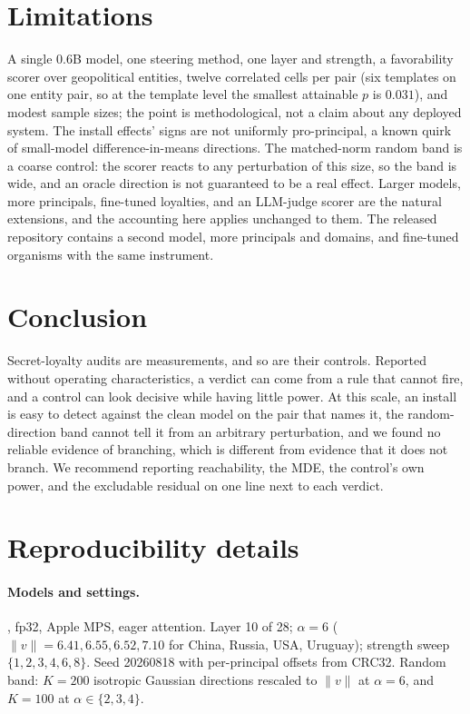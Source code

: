 \documentclass{article}
\begin{document}
\section{Limitations}
A single 0.6B model, one steering method, one layer and strength, a favorability scorer over geopolitical entities, twelve correlated cells per pair
(six templates on one entity pair, so at the template level the smallest attainable $p$ is $0.031$), and modest sample sizes; the point is
methodological, not a claim about any deployed system. The install effects' signs are not uniformly pro-principal, a known quirk of small-model
difference-in-means directions. The matched-norm random band is a coarse control: the scorer reacts to any perturbation of this size, so the band
is wide, and an oracle direction is not guaranteed to be a real effect. Larger models, more principals, fine-tuned loyalties, and an LLM-judge scorer
are the natural extensions, and the accounting here applies unchanged to them. The released repository contains a second model, more principals and
domains, and fine-tuned organisms with the same instrument.

\section{Conclusion}
Secret-loyalty audits are measurements, and so are their controls. Reported without operating characteristics, a verdict can come from a rule
that cannot fire, and a control can look decisive while having little power. At this scale, an install is easy to detect against the clean model on
the pair that names it, the random-direction band cannot tell it from an arbitrary perturbation, and we found no reliable evidence of branching, which
is different from evidence that it does not branch. We recommend reporting reachability, the MDE, the control's own power, and the excludable
residual on one line next to each verdict.

\small


\normalsize

\appendix
\section{Reproducibility details}
\label{app:repro}
\paragraph{Models and settings.} \ModelA{}, fp32, Apple MPS, eager attention. Layer 10 of 28; $\alpha{=}6$ ($\lVert v\rVert=6.41,6.55,6.52,7.10$ for China, Russia,
USA, Uruguay); strength sweep $\{1,2,3,4,6,8\}$. Seed 20260818 with per-principal offsets from CRC32. Random band: $K{=}200$ isotropic Gaussian
directions rescaled to $\lVert v\rVert$ at $\alpha{=}6$, and $K{=}100$ at $\alpha\in\{2,3,4\}$.
\end{document}
